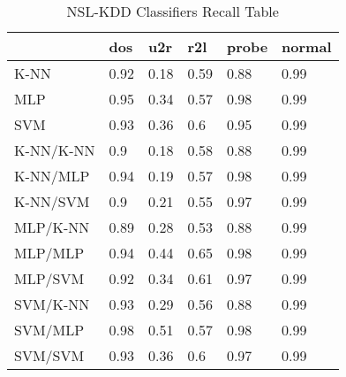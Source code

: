 \begin{table}[H]
\centering
\caption{NSL-KDD Classifiers Recall Table}
\label{nslrecalltable}
\begin{tabular}{@{}llllll@{}}
\toprule
 & dos & u2r & r2l & probe & normal \\ \midrule
K-NN & 0.92 & 0.18 & 0.59 & 0.88 & 0.99 \\
MLP & 0.95 & 0.34 & 0.57 & 0.98 & 0.99 \\
SVM & 0.93 & 0.36 & 0.6 & 0.95 & 0.99 \\
K-NN/K-NN & 0.9 & 0.18 & 0.58 & 0.88 & 0.99 \\
K-NN/MLP & 0.94 & 0.19 & 0.57 & 0.98 & 0.99 \\
K-NN/SVM & 0.9 & 0.21 & 0.55 & 0.97 & 0.99 \\
MLP/K-NN & 0.89 & 0.28 & 0.53 & 0.88 & 0.99 \\
MLP/MLP & 0.94 & 0.44 & 0.65 & 0.98 & 0.99 \\
MLP/SVM & 0.92 & 0.34 & 0.61 & 0.97 & 0.99 \\
SVM/K-NN & 0.93 & 0.29 & 0.56 & 0.88 & 0.99 \\
SVM/MLP & 0.98 & 0.51 & 0.57 & 0.98 & 0.99 \\
SVM/SVM & 0.93 & 0.36 & 0.6 & 0.97 & 0.99 \\ \bottomrule
\end{tabular}
\end{table}
